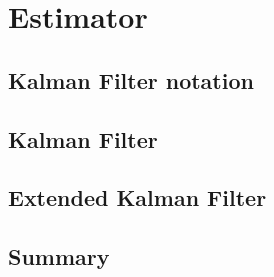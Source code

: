 \chapter{Estimator}
\label{chap:fourth}
\ifpdf
    \graphicspath{{Chapter4/Figures/PNG/}{Chapter4/Figures/PDF/}{Chapter4/Figures/}{Chapter4/Figures/EPS/}}
\else
    \graphicspath{{Chapter4/Figures/EPS/}{Chapter4/Figures/}}
\fi


\section{Kalman Filter notation}
\section{Kalman Filter}

\section{Extended Kalman Filter}


\section{Summary}